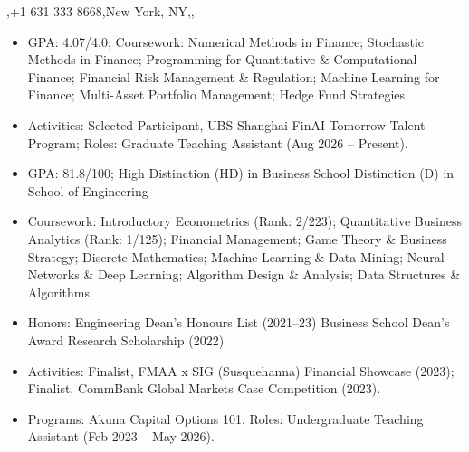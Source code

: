 \documentclass{article}
\begin{document}
  {\sep +1 631 333 8668\sep New York, NY\sep \linkedin\sep \github}
\cvheaderend

\begin{itemize}
  \item GPA: 4.07/4.0; Coursework: Numerical Methods in Finance; Stochastic Methods in Finance; Programming for Quantitative \& Computational Finance; Financial Risk Management \& Regulation; Machine Learning for Finance; Multi-Asset Portfolio Management; Hedge Fund Strategies
  \item Activities: Selected Participant, UBS Shanghai FinAI Tomorrow Talent Program; Roles: Graduate Teaching Assistant (Aug 2026 -- Present).
\end{itemize}
\entrygap
{}
\begin{itemize}
  \item GPA: 81.8/100; High Distinction (HD) in Business School \textbar{} Distinction (D) in School of Engineering
  \item Coursework: Introductory Econometrics (Rank: 2/223); Quantitative Business Analytics (Rank: 1/125); Financial Management; Game Theory \& Business Strategy; Discrete Mathematics; Machine Learning \& Data Mining; Neural Networks \& Deep Learning; Algorithm Design \& Analysis; Data Structures \& Algorithms
  \item Honors: Engineering Dean's Honours List (2021--23) \textbar{} Business School Dean's Award \textbar{} Research Scholarship (2022)
  \item Activities: Finalist, FMAA x SIG (Susquehanna) Financial Showcase (2023); Finalist, CommBank Global Markets Case Competition (2023).
  \item Programs: Akuna Capital Options 101. Roles: Undergraduate Teaching Assistant (Feb 2023 -- May 2026).
\end{itemize}

\cvpublications
\end{document}
